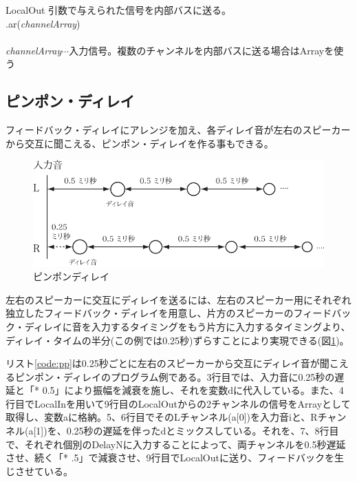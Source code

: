 \documentclass{jsarticle}
\begin{document}
\begin{itembox}[l]{LocalOut}
	{\footnotesize 
	引数で与えられた信号を内部バスに送る。\\
	.ar({\it channelArray})\\\\
	{\it channelArray}$\cdots$入力信号。複数のチャンネルを内部バスに送る場合はArrayを使う\\
	}
\end{itembox}

\subsection{ピンポン・ディレイ}
フィードバック・ディレイにアレンジを加え、各ディレイ音が左右のスピーカーから交互に聞こえる、ピンポン・ディレイを作る事もできる。

\begin{figure}[htbp]
	\begin{center}
		\includegraphics[scale=0.65]{pingpong.pdf}
	\end{center}
	\caption{ピンポンディレイ}
	\label{fig:pingpong}
\end{figure}

左右のスピーカーに交互にディレイを送るには、左右のスピーカー用にそれぞれ独立したフィードバック・ディレイを用意し、片方のスピーカーのフィードバック・ディレイに音を入力するタイミングをもう片方に入力するタイミングより、ディレイ・タイムの半分(この例では0.25秒)ずらすことにより実現できる(図\ref{fig:pingpong})。

リスト\ref{code:pp}は0.25秒ごとに左右のスピーカーから交互にディレイ音が聞こえるピンポン・ディレイのプログラム例である。3行目では、入力音に0.25秒の遅延と「* 0.5」により振幅を減衰を施し、それを変数dに代入している。また、4行目でLocalInを用いて9行目のLocalOutからの2チャンネルの信号をArrayとして取得し、変数aに格納。5、6行目でそのLチャンネル(a[0])を入力音iと、Rチャンネル(a[1])を、0.25秒の遅延を伴ったdとミックスしている。それを、7、8行目で、それぞれ個別のDelayNに入力することによって、両チャンネルを0.5秒遅延させ、続く「* .5」で減衰させ、9行目でLocalOutに送り、フィードバックを生じさせている。
\end{document}
